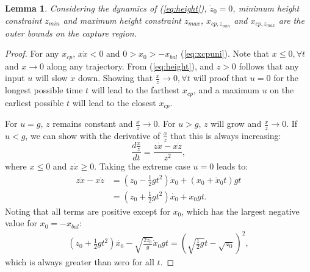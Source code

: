 \documentclass[letterpaper, 10 pt, conference]{ieeeconf}  %
\newcommand{\zmin}{z_{min}}
\newcommand{\zmax}{z_{max}}
\newtheorem{lem}{Lemma}
\begin{document}
\begin{lem}\label{lem:regionz}
Considering the dynamics of (\ref{eq:height}), $\dot{z}_0=0$, minimum height constraint $\zmin$ and maximum height constraint $\zmax$, $x_{cp,\zmin}$ and $x_{cp,\zmax}$ are the outer bounds on the capture region.
\end{lem}
\begin{proof}
For any $x_{cp}$, $x\dot{x}<0$ \cite{koolen2016balance} and $0>x_0>-x_{bal}$ (\ref{eq:xcpuni}). 
Note that $x \leq 0, \forall t$ and $x\rightarrow 0$ along any trajectory. From (\ref{eq:height}), and $z>0$ follows that any input $u$ will slow $\dot{x}$ down. Showing that $\frac{x}{z}\rightarrow 0, \forall t$ will proof that $u=0$ for the longest possible time $t$ will lead to the farthest $x_{cp}$, and a maximum $u$ on the earliest possible $t$ will lead to the closest $x_{cp}$. 

For $u=g$, $z$ remains constant and $\frac{x}{z}\rightarrow 0$. For $u>g$, $z$ will grow and $\frac{x}{z}\rightarrow 0$. If $u<g$, we can show with the derivative of $\frac{x}{z}$ that this is always increasing:
\begin{equation}
\frac{d\frac{x}{z}}{dt}= \frac{z\dot{x}-x\dot{z}}{z^2},
\end{equation}
where $x \leq 0$ and $z \dot{x} \geq 0$. Taking the extreme case $u=0$ leads to:
\begin{align}
	z\dot{x}-x\dot{z} &= (z_0 - \frac{1}{2}gt^2)\dot{x}_0 + (x_0 + \dot{x}_0 t)gt\\
	&= (z_0 +\frac{1}{2}gt^2)\dot{x_0} + x_0gt.
\end{align}
Noting that all terms are positive except for $x_0$, which has the largest negative value for $x_0=-x_{bal}$:
\begin{align}
	(z_0 +\frac{1}{2}gt^2)\dot{x_0} - \sqrt{\frac{2z_0}{g}}\dot{x}_0gt = (\sqrt{\frac{1}{2}g}t - \sqrt{z_0})^2,
\end{align}
which is always greater than zero for all $t$.
\end{proof}
\end{document}
